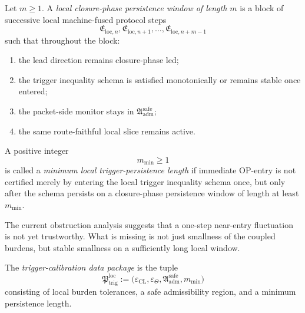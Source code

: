\begin{definition}
\label{def:local-closure-phase-persistence-window-of-length-m}
Let \(m\ge 1\).
A \emph{local closure-phase persistence window of length \(m\)} is a block of successive local machine-fused protocol steps
\[
\mathfrak{E}_{\mathrm{loc},n},\mathfrak{E}_{\mathrm{loc},n+1},\dots,\mathfrak{E}_{\mathrm{loc},n+m-1}
\]
such that throughout the block:
\begin{enumerate}
 \item the lead direction remains closure-phase led;
 \item the trigger inequality schema is satisfied monotonically or remains stable once entered;
 \item the packet-side monitor stays in \(\mathfrak{A}_{\mathrm{adm}}^{\mathrm{safe}}\);
 \item the same route-faithful local slice remains active.
\end{enumerate}
\end{definition}

\begin{definition}
\label{def:minimum-local-trigger-persistence-length}
A positive integer
\[
m_{\min}\ge 1
\]
is called a \emph{minimum local trigger-persistence length} if immediate OP-entry is not certified merely by entering the local trigger inequality schema once, but only after the schema persists on a closure-phase persistence window of length at least \(m_{\min}\).
\end{definition}

\begin{remark}
\label{rem:why-a-persistence-length-is-needed}
The current obstruction analysis suggests that a one-step near-entry fluctuation is not yet trustworthy.
What is missing is not just smallness of the coupled burdens, but stable smallness on a sufficiently long local window.
\end{remark}

\begin{definition}
\label{def:trigger-calibration-data-package}
The \emph{trigger-calibration data package} is the tuple
\[
\mathfrak{P}_{\mathrm{trig}}^{\mathrm{loc}}
:=
\bigl(
\varepsilon_{\mathrm{CL}},
\varepsilon_{\Theta},
\mathfrak{A}_{\mathrm{adm}}^{\mathrm{safe}},
 m_{\min}
\bigr)
\]
consisting of local burden tolerances, a safe admissibility region, and a minimum persistence length.
\end{definition}

